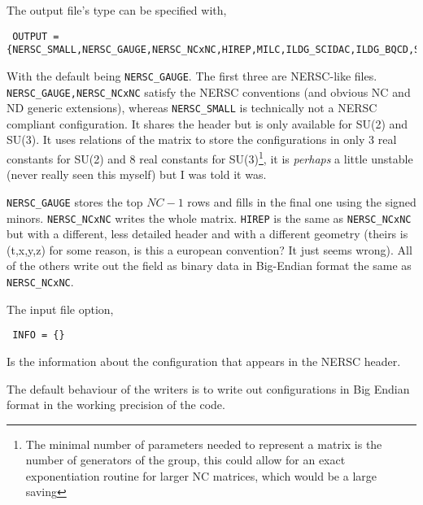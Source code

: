 \documentclass[12pt]{article}
\begin{document}
The output file's type can be specified with,
\begin{verbatim}
 OUTPUT = {NERSC_SMALL,NERSC_GAUGE,NERSC_NCxNC,HIREP,MILC,ILDG_SCIDAC,ILDG_BQCD,SCIDAC}
\end{verbatim}
With the default being \verb|NERSC_GAUGE|. The first three are NERSC-like files. \verb|NERSC_GAUGE,NERSC_NCxNC| satisfy the NERSC conventions (and obvious NC and ND generic extensions), whereas \verb|NERSC_SMALL| is technically not a NERSC compliant configuration. It shares the header but is only available for SU(2) and SU(3). It uses relations of the matrix to store the configurations in only 3 real constants for SU(2) and 8 real constants for SU(3)\footnote{The minimal number of parameters needed to represent a matrix is the number of generators of the group, this could allow for an exact exponentiation routine for larger NC matrices, which would be a large saving}, it is \textit{perhaps} a little unstable (never really seen this myself) but I was told it was.

\verb|NERSC_GAUGE| stores the top $NC-1$ rows and fills in the final one using the signed minors. \verb|NERSC_NCxNC| writes the whole matrix. \verb|HIREP| is the same as \verb|NERSC_NCxNC| but with a different, less detailed header and with a different geometry (theirs is (t,x,y,z) for some reason, is this a european convention? It just seems wrong). All of the others write out the field as binary data in Big-Endian format the same as \verb|NERSC_NCxNC|.

The input file option,
\begin{verbatim}
 INFO = {}
\end{verbatim}
Is the information about the configuration that appears in the NERSC header.

The default behaviour of the writers is to write out configurations in Big Endian format in the working precision of the code.
\end{document}
